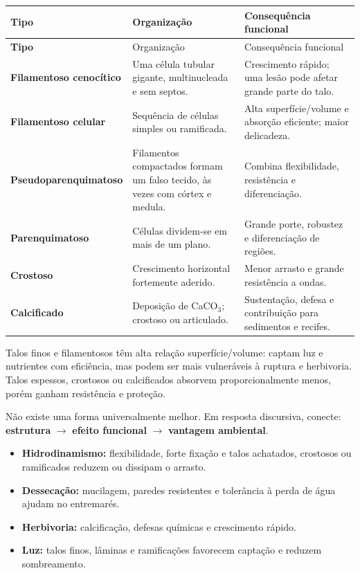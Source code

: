 \documentclass[12pt,a4paper]{article}
\begin{document}
\begin{longtable}{>{\bfseries}p{}p{}p{}}
\toprule
Tipo & Organização & Consequência funcional\\
\midrule
\endfirsthead
\toprule
Tipo & Organização & Consequência funcional\\
\midrule
\endhead
Filamentoso cenocítico & Uma célula tubular gigante, multinucleada e sem
septos. & Crescimento rápido; uma lesão pode afetar grande parte do talo.\\
Filamentoso celular & Sequência de células simples ou ramificada. & Alta
superfície/volume e absorção eficiente; maior delicadeza.\\
Pseudo\-parenquimatoso & Filamentos compactados formam um falso tecido, às vezes
com córtex e medula. & Combina flexibilidade, resistência e diferenciação.\\
Parenquimatoso & Células dividem-se em mais de um plano. & Grande porte,
robustez e diferenciação de regiões.\\
Crostoso & Crescimento horizontal fortemente aderido. & Menor arrasto e grande
resistência a ondas.\\
Calcificado & Deposição de CaCO$_3$; crostoso ou articulado. & Sustentação,
defesa e contribuição para sedimentos e recifes.\\
\bottomrule
\end{longtable}

Talos finos e filamentosos têm alta relação superfície/volume: captam luz e
nutrientes com eficiência, mas podem ser mais vulneráveis à ruptura e
herbivoria. Talos espessos, crostosos ou calcificados absorvem
proporcionalmente menos, porém ganham resistência e proteção.

\begin{raciocinio}
Não existe uma forma universalmente melhor. Em resposta discursiva, conecte:
\textbf{estrutura} $\rightarrow$ \textbf{efeito funcional}
$\rightarrow$ \textbf{vantagem ambiental}.
\end{raciocinio}

\begin{itemize}
\item \textbf{Hidrodinamismo:} flexibilidade, forte fixação e talos achatados,
crostosos ou ramificados reduzem ou dissipam o arrasto.
\item \textbf{Dessecação:} mucilagem, paredes resistentes e tolerância à perda
de água ajudam no entremarés.
\item \textbf{Herbivoria:} calcificação, defesas químicas e crescimento rápido.
\item \textbf{Luz:} talos finos, lâminas e ramificações favorecem captação e
reduzem sombreamento.
\end{itemize}
\end{document}
